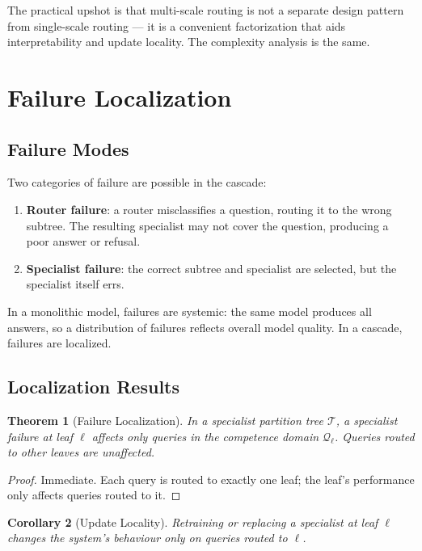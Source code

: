 \documentclass[11pt,a4paper]{article}
\newtheorem{theorem}{Theorem}[section]
\newtheorem{corollary}[theorem]{Corollary}
\theoremstyle{definition}
\theoremstyle{remark}
\newcommand{\Tc}{\mathcal{T}}
\begin{document}
The practical upshot is that multi-scale routing is not a separate design pattern from single-scale routing --- it is a convenient factorization that aids interpretability and update locality. The complexity analysis is the same.

\section{Failure Localization}
\label{sec:failure}

\subsection{Failure Modes}

Two categories of failure are possible in the cascade:
\begin{enumerate}
    \item \textbf{Router failure}: a router misclassifies a question, routing it to the wrong subtree. The resulting specialist may not cover the question, producing a poor answer or refusal.
    \item \textbf{Specialist failure}: the correct subtree and specialist are selected, but the specialist itself errs.
\end{enumerate}

In a monolithic model, failures are systemic: the same model produces all answers, so a distribution of failures reflects overall model quality. In a cascade, failures are localized.

\subsection{Localization Results}

\begin{theorem}[Failure Localization]
\label{thm:fail-localize}
In a specialist partition tree $\Tc$, a specialist failure at leaf $\ell$ affects only queries in the competence domain $\mathcal{Q}_\ell$. Queries routed to other leaves are unaffected.
\end{theorem}

\begin{proof}
Immediate. Each query is routed to exactly one leaf; the leaf's performance only affects queries routed to it.
\end{proof}

\begin{corollary}[Update Locality]
\label{cor:update}
Retraining or replacing a specialist at leaf $\ell$ changes the system's behaviour only on queries routed to $\ell$.
\end{corollary}
\end{document}
